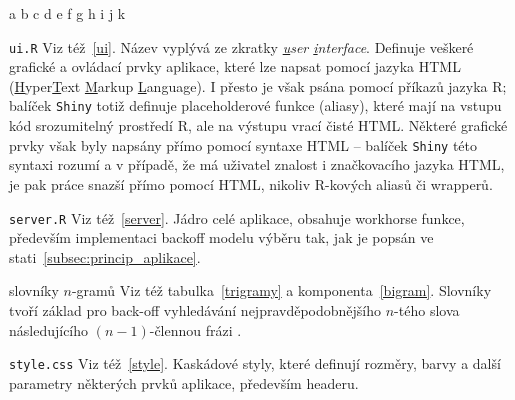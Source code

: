 \begin{labeling}{a b c d e f g h i j k}

  \item [\texttt{ui.R}] Viz též~\ref{ui}. Název vyplývá ze zkratky
  \textit{\underline{u}ser \underline{i}nterface}. Definuje veškeré grafické
  a ovládací prvky aplikace, které lze napsat pomocí jazyka HTML
  (\underline{H}yper\underline{T}ext \underline{M}arkup \underline{L}anguage).
  I přesto je však psána pomocí příkazů jazyka \textsf{R}; balíček
  \texttt{Shiny} totiž definuje placeholderové funkce (aliasy), které mají na
  vstupu kód srozumitelný prostředí \textsf{R}, ale na výstupu vrací čisté
  HTML. Některé grafické prvky však byly napsány přímo pomocí syntaxe HTML%
  -- balíček \texttt{Shiny} této syntaxi rozumí a v případě, že má uživatel
  znalost i značkovacího jazyka HTML, je pak práce snazší přímo pomocí HTML,
  nikoliv \textsf{R}-kových aliasů či wrapperů.
  
  \item [\texttt{server.R}] Viz též~\ref{server}. Jádro celé aplikace,
  obsahuje workhorse funkce, především implementaci backoff modelu výběru tak,
  jak je popsán ve stati~\ref{subsec:princip_aplikace}.
  
  \item [slovníky $n$-gramů] Viz též tabulka~\ref{trigramy}
  a komponenta~\ref{bigram}. Slovníky tvoří základ pro back-off vyhledávání%
  nejpravděpodobnějšího $n$-tého slova následujícího $(n - 1)$-člennou frázi%
  .
 
  \item [\texttt{style.css}] Viz též~\ref{style}. Kaskádové styly, které
  definují rozměry, barvy a další parametry některých prvků aplikace, především
  headeru.

  
\end{labeling}


\newpage







